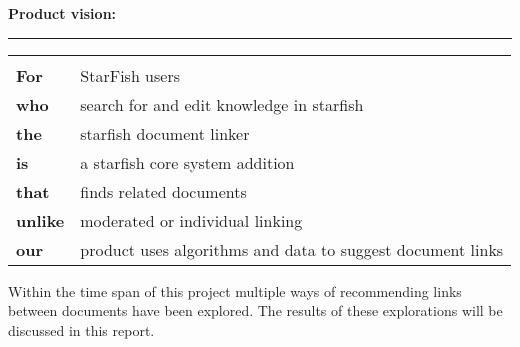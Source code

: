 \begin{shaded}
\textbf{{\large Product vision:}} \vspace{0.4\baselineskip} \hrule
 	\begin{tabular}{ll}
 		& \\
 		{\bf For} & StarFish users \\
 		{\bf who} & search for and edit knowledge in starfish\\
 		{\bf the} & starfish document linker \\
 		{\bf is} & a starfish core system addition\\
 		{\bf that} & finds related documents\\
 		{\bf unlike} & moderated or individual linking\\
 		{\bf our} & product uses algorithms and data to suggest document links 
	\end{tabular}
\end{shaded}


Within the time span of this project multiple ways of recommending links between documents have been explored. The results of these explorations will be discussed in this report. 